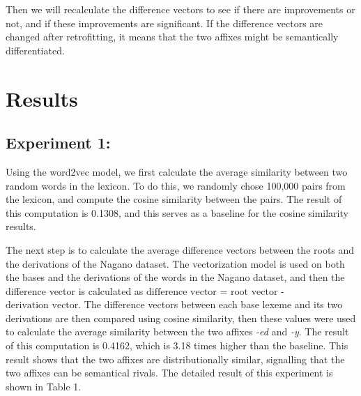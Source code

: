 \documentclass[12pt]{article}
\begin{document}
    Then we will recalculate the difference vectors to see if there are improvements or not, and if these improvements are significant. If the difference vectors are changed after retrofitting, it means that the two affixes might be semantically differentiated.

\section{Results}
    \subsection{Experiment 1:}
    Using the word2vec model, we first calculate the average similarity between two random words in the lexicon. To do this, we randomly chose 100,000 pairs from the lexicon, and compute the cosine similarity between the pairs. The result of this computation is 0.1308, and this serves as a baseline for the cosine similarity results. 

    The next step is to calculate the average difference vectors between the roots and the derivations of the Nagano dataset. The vectorization model is used on both the bases and the derivations of the words in the Nagano dataset, and then the difference vector is calculated as $\text{difference vector}$ = $\text{root vector}$ - $\text{derivation vector}$. The difference vectors between each base lexeme and its two derivations are then compared using cosine similarity, then these values were used to calculate the average similarity between the two affixes \emph{-ed} and \emph{-y}. The result of this computation is 0.4162, which is 3.18 times higher than the baseline. This result shows that the two affixes are distributionally similar, signalling that the two affixes can be semantical rivals. The detailed result of this experiment is shown in Table 1.
\end{document}
